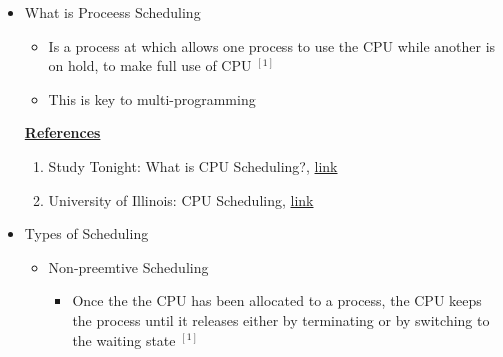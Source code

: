 \documentclass[12pt]{article}
\begin{document}
\begin{itemize}
    \item What is Proceess Scheduling
    \begin{itemize}
        \item Is a process at which allows one process to use the CPU while
        another is on hold, to make full use of CPU $^{[1]}$
        \item This is key to multi-programming
    \end{itemize}

    \bigskip

    \underline{\textbf{References}}

    \bigskip

    \begin{enumerate}[1)]
        \item Study Tonight: What is CPU Scheduling?, \href{https://www.studytonight.com/operating-system/cpu-scheduling}{link}
        \item University of Illinois: CPU Scheduling, \href{https://www.cs.uic.edu/~jbell/CourseNotes/OperatingSystems/6_CPU_Scheduling.html}{link}
    \end{enumerate}

    \item Types of Scheduling
    \begin{itemize}
        \item Non-preemtive Scheduling
        \begin{itemize}
            \item Once the the CPU has been allocated to a process, the CPU
            keeps the process until it releases either by terminating or by switching
            to the waiting state $^{[1]}$


\end{itemize}
\end{itemize}
\end{itemize}
\end{document}
